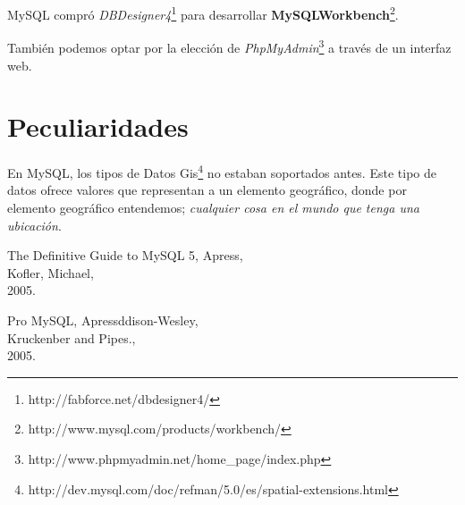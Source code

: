 \documentclass[11pt]{article}
\begin{document}
\par MySQL compr\'o \emph{DBDesigner4}\footnote{http://fabforce.net/dbdesigner4/} para desarrollar \textbf{MySQLWorkbench}\footnote{http://www.mysql.com/products/workbench/}.

Tambi\'en podemos optar por la elecci\'on de \emph{PhpMyAdmin}\footnote{http://www.phpmyadmin.net/home\_page/index.php} a trav\'es de un interfaz web.

\section{Peculiaridades}
\label{sec:peculiaridades}

\par En MySQL, los tipos de Datos Gis\footnote{http://dev.mysql.com/doc/refman/5.0/es/spatial-extensions.html} no estaban soportados antes. Este tipo de datos ofrece valores que representan a un elemento geogr\'afico, donde por elemento geogr\'afico entendemos; \emph{cualquier cosa en el mundo que tenga una ubicaci\'on}.

\begin{thebibliography}{9}

    The Definitive Guide to MySQL 5, Apress,\\
    Kofler, Michael,\\
    2005.

    Pro MySQL, Apressddison-Wesley,\\
    Kruckenber and Pipes.,\\ 
    2005.

\end{thebibliography}
\end{document}
